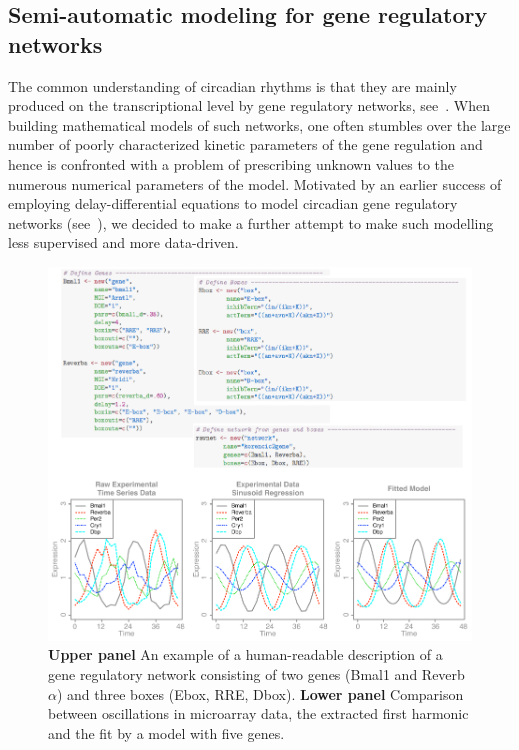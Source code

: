 \subsection{Semi-automatic modeling for gene regulatory networks} The
common understanding of circadian rhythms is that they are mainly
produced on the transcriptional level by gene regulatory networks,
see~\cite{reppert2002coordination}. When building mathematical models
of such networks, one often stumbles over the large number of poorly
characterized kinetic parameters of the gene regulation and hence is
confronted with a problem of prescribing unknown values to the
numerous numerical parameters of the model. Motivated by an earlier
success of employing delay-differential equations to model circadian
gene regulatory networks (see~\cite{korencic2012interplay}), we
decided to make a further attempt to make such modelling less
supervised and more data-driven.


\begin{figure}
\begin{center}
\includegraphics[width=\linewidth]{figures/matt/matt.pdf}
\end{center}
\caption{
  {\bf Upper panel} An example of a human-readable description of a
  gene regulatory network consisting of two genes (Bmal1 and
  Reverb$\alpha$) and three boxes (Ebox, RRE, Dbox).
  {\bf Lower panel} Comparison between oscillations in microarray
  data, the extracted first harmonic and the fit by a model with five
  genes.
\label{fig::matt}
}
\end{figure}

